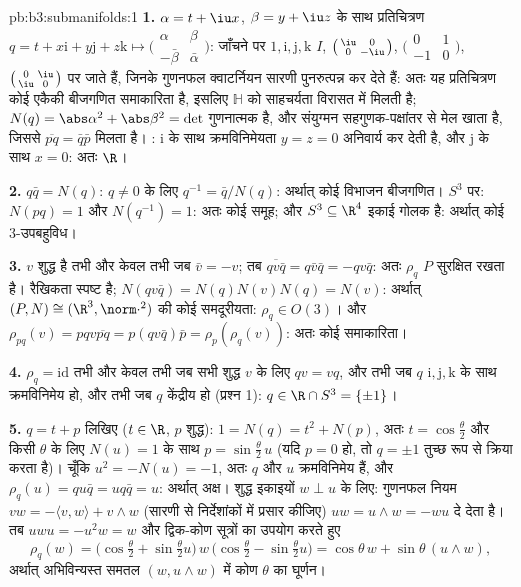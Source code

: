 \begin{solution}{pb:b3:submanifolds:1}
\textbf{1.} $\alpha = t + \iu
x$, $\beta = y + \iu z$ के साथ प्रतिचित्रण $q = t + x\mathrm i + y\mathrm j + z\mathrm k
\mapsto \bigl(\begin{smallmatrix}\alpha & \beta\\ -\bar\beta
& \bar\alpha\end{smallmatrix}\bigr)$: जाँचने पर $1, \mathrm i,
\mathrm j, \mathrm k$
$I$, $\bigl(\begin{smallmatrix}
\iu & 0\\ 0 & -\iu\end{smallmatrix}\bigr)$, $\bigl(\begin{smallmatrix}0 & 1\\ -1 &
0\end{smallmatrix}\bigr)$, $\bigl(\begin{smallmatrix}0 &
\iu\\ \iu & 0\end{smallmatrix}\bigr)$ पर जाते हैं, जिनके गुणनफल क्वाटर्नियन
सारणी पुनरुत्पन्न कर देते हैं: अतः यह प्रतिचित्रण कोई एकैकी बीजगणित
समाकारिता है, इसलिए $\mathbb H$ को साहचर्यता विरासत में मिलती है; $N(q) = \abs\alpha^2 + \abs\beta^2 = \det$
गुणनात्मक है, और संयुग्मन सहगुणक-पक्षांतर से मेल खाता है, जिससे $\overline{pq} = \bar q\bar p$
मिलता है। : $\mathrm i$ के साथ क्रमविनिमेयता $y = z = 0$ अनिवार्य कर देती
है, और $\mathrm j$ के साथ $x = 0$: अतः $\R$।

\textbf{2.} $q\bar q = N(q)$: $q \neq 0$ के लिए $q^{-1} = \bar
q/N(q)$: अर्थात् कोई विभाजन बीजगणित।
$S^3$ पर: $N(pq) = 1$ और $N(q^{-1}) = 1$: अतः कोई समूह; और $S^3 \subseteq \R^4$ इकाई गोलक है: अर्थात्
कोई  $3$-उपबहुविध।

\textbf{3.} $v$ शुद्ध है तभी और केवल तभी जब $\bar v = -v$; तब $\overline{qv\bar q} = q\bar v\bar q = -qv\bar q$: अतः
$\rho_q$ $P$ सुरक्षित रखता है। रैखिकता स्पष्ट है; $N(qv\bar q) =
N(q)N(v)N(q) = N(v)$: अर्थात् $(P, N) \cong (\R^3,
\norm\cdot^2)$
की कोई समदूरीयता: $\rho_q \in O(3)$। और $\rho_{pq}(v) =
pqv\overline{pq} = p(qv\bar q)\bar p =
\rho_p(\rho_q(v))$: अतः कोई समाकारिता।

\textbf{4.} $\rho_q = \mathrm{id}$ तभी और केवल तभी जब सभी शुद्ध $v$ के लिए $qv = vq$,
और तभी जब $q$ $\mathrm i, \mathrm j, \mathrm k$ के साथ क्रमविनिमेय हो, और तभी जब $q$ केंद्रीय
हो (प्रश्न 1): $q \in \R\cap S^3 =
\{\pm1\}$।

\textbf{5.} $q = t + p$ लिखिए ($t \in \R$, $p$ शुद्ध): $1 =
N(q) = t^2 + N(p)$, अतः $t = \cos\frac\theta2$ और
किसी $\theta$ के लिए $N(u) = 1$ के साथ $p =
\sin\frac\theta2\,u$ (यदि $p = 0$ हो, तो $q = \pm1$ तुच्छ
रूप से क्रिया करता है)। चूँकि $u^2 = -N(u)
= -1$, अतः $q$ और $u$ क्रमविनिमेय
हैं, और $\rho_q(u) = qu\bar q =
uq\bar q = u$: अर्थात् अक्ष। शुद्ध इकाइयों $w \perp u$ के लिए: गुणनफल नियम
$vw = -\langle v, w\rangle + v\wedge w$ (सारणी से निर्देशांकों में प्रसार कीजिए) $uw = u\wedge w
= -wu$ दे देता है। तब
$uwu = -u^2w = w$ और द्विक-कोण सूत्रों का उपयोग करते हुए
\[
\rho_q(w) = \bigl(\cos\tfrac\theta2 +
\sin\tfrac\theta2u\bigr)\,w\,\bigl(\cos\tfrac\theta2 -
\sin\tfrac\theta2u\bigr)
= \cos\theta\,w + \sin\theta\,(u\wedge w),
\]
अर्थात् अभिविन्यस्त समतल $(w,
u\wedge w)$ में कोण $\theta$ का घूर्णन।


\end{solution}
